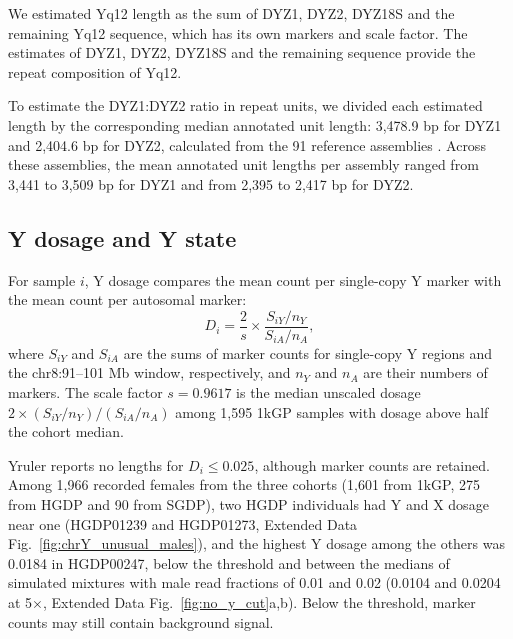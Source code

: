 We estimated Yq12 length as the sum of DYZ1, DYZ2, DYZ18S and the remaining Yq12 sequence, which has its own markers and scale factor. The estimates of DYZ1, DYZ2, DYZ18S and the remaining sequence provide the repeat composition of Yq12.

To estimate the DYZ1:DYZ2 ratio in repeat units, we divided each estimated length by the corresponding median annotated unit length: 3,478.9 bp for DYZ1 and 2,404.6 bp for DYZ2, calculated from the 91 reference assemblies \cite{Hallast2026}. Across these assemblies, the mean annotated unit lengths per assembly ranged from 3,441 to 3,509 bp for DYZ1 and from 2,395 to 2,417 bp for DYZ2.

\subsection{Y dosage and Y state}\label{sec:m-dosage}
For sample $i$, Y dosage compares the mean count per single-copy Y marker with the mean count per autosomal marker:
\begin{equation}
 D_i=\frac{2}{s}\times\frac{S_{iY}/n_Y}{S_{iA}/n_A},
\end{equation}
where $S_{iY}$ and $S_{iA}$ are the sums of marker counts for single-copy Y regions and the chr8:91--101 Mb window, respectively, and $n_Y$ and $n_A$ are their numbers of markers. The scale factor $s=0.9617$ is the median unscaled dosage $2\times(S_{iY}/n_Y)/(S_{iA}/n_A)$ among 1,595 1kGP samples with dosage above half the cohort median.

Yruler reports no lengths for $D_i\le0.025$, although marker counts are retained. Among 1,966 recorded females from the three cohorts (1,601 from 1kGP, 275 from HGDP and 90 from SGDP), two HGDP individuals had Y and X dosage near one (HGDP01239 and HGDP01273, Extended Data Fig.~\ref{fig:chrY_unusual_males}), and the highest Y dosage among the others was 0.0184 in HGDP00247, below the threshold and between the medians of simulated mixtures with male read fractions of 0.01 and 0.02 (0.0104 and 0.0204 at 5$\times$, Extended Data Fig.~\ref{fig:no_y_cut}a,b). Below the threshold, marker counts may still contain background signal.


